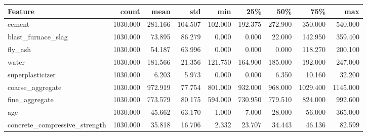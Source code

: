 \begin{tabular}{lrrrrrrrr}
\toprule
Feature & count & mean & std & min & 25\% & 50\% & 75\% & max \\
\midrule
cement & 1030.000 & 281.166 & 104.507 & 102.000 & 192.375 & 272.900 & 350.000 & 540.000 \\
blast\_furnace\_slag & 1030.000 & 73.895 & 86.279 & 0.000 & 0.000 & 22.000 & 142.950 & 359.400 \\
fly\_ash & 1030.000 & 54.187 & 63.996 & 0.000 & 0.000 & 0.000 & 118.270 & 200.100 \\
water & 1030.000 & 181.566 & 21.356 & 121.750 & 164.900 & 185.000 & 192.000 & 247.000 \\
superplasticizer & 1030.000 & 6.203 & 5.973 & 0.000 & 0.000 & 6.350 & 10.160 & 32.200 \\
coarse\_aggregate & 1030.000 & 972.919 & 77.754 & 801.000 & 932.000 & 968.000 & 1029.400 & 1145.000 \\
fine\_aggregate & 1030.000 & 773.579 & 80.175 & 594.000 & 730.950 & 779.510 & 824.000 & 992.600 \\
age & 1030.000 & 45.662 & 63.170 & 1.000 & 7.000 & 28.000 & 56.000 & 365.000 \\
concrete\_compressive\_strength & 1030.000 & 35.818 & 16.706 & 2.332 & 23.707 & 34.443 & 46.136 & 82.599 \\
\bottomrule
\end{tabular}